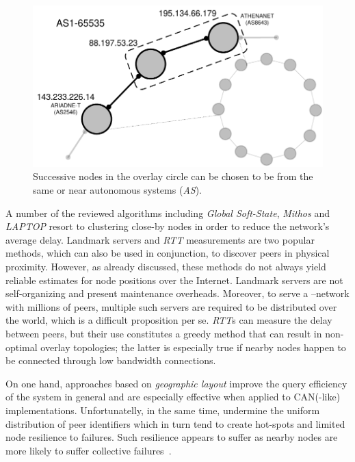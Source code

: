 \begin{figure}[ht]
\centering
  \includegraphics[scale=0.4]{img/pdf/geographic-layout.pdf}
\caption{Successive nodes in the overlay circle can be chosen to be from the
same or near autonomous systems (\emph{AS}).}
\label{figure:geographic-layout}
\end{figure}
A number of the reviewed algorithms including 
\emph{Global Soft-State},
\emph{Mithos} and \emph{LAPTOP} resort to clustering close-by nodes in
order to reduce the network's average delay.
Landmark servers and \emph{RTT} measurements are two popular methods, which
can also be used in conjunction, to discover peers in physical proximity.
However, as already discussed, these
methods do not always yield reliable estimates for node positions over the
Internet. 
Landmark servers are not self-organizing and present maintenance
overheads. Moreover, to serve a \p--network with millions of peers, multiple
such servers are required to be distributed over the world, which is a difficult
proposition per se.
\emph{RTT}s can measure the delay between peers, but their use constitutes a
greedy method that can result in non-optimal overlay topologies;
the latter is especially true if nearby 
nodes happen to be connected through low bandwidth connections.

On one hand, approaches based on \emph{geographic layout} improve the query
efficiency of the system in general and are especially effective when applied
to CAN(-like) implementations. Unfortunatelly, in the same time, undermine the
uniform distribution of peer identifiers which in turn tend to create 
hot-spots and limited node resilience to failures. Such resilience appears to
suffer as nearby nodes are more likely to suffer collective
failures~\cite{HY2007}.

